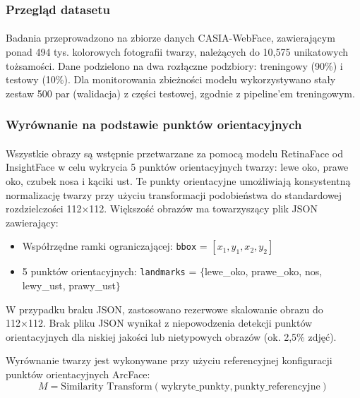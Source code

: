 \subsubsection{Przegląd datasetu}

\paragraph{}Badania przeprowadzono na zbiorze danych CASIA-WebFace, zawierającym ponad 494 tys. kolorowych fotografii twarzy, należących do 10,575 unikatowych tożsamości. Dane podzielono na dwa rozłączne podzbiory: treningowy (90\%) i testowy (10\%). Dla monitorowania zbieżności modelu wykorzystywano stały zestaw 500 par (walidacja) z części testowej, zgodnie z pipeline’em treningowym.

\subsubsection{Wyrównanie na podstawie punktów orientacyjnych}

\paragraph{}Wszystkie obrazy są wstępnie przetwarzane za pomocą modelu RetinaFace od InsightFace w celu wykrycia 5 punktów orientacyjnych twarzy: lewe oko, prawe oko, czubek nosa i kąciki ust. Te punkty orientacyjne umożliwiają konsystentną normalizację twarzy przy użyciu transformacji podobieństwa do standardowej rozdzielczości 112×112. Większość obrazów ma towarzyszący plik JSON zawierający:
\begin{itemize}
    \item Współrzędne ramki ograniczającej: \texttt{bbox} = $[x_1, y_1, x_2, y_2]$
    \item 5 punktów orientacyjnych: \texttt{landmarks} = $\{$lewe\_oko, prawe\_oko, nos, lewy\_ust, prawy\_ust$\}$
\end{itemize}

W przypadku braku JSON, zastosowano rezerwowe skalowanie obrazu do 112×112. Brak pliku JSON wynikał z niepowodzenia detekcji punktów orientacyjnych dla niskiej jakości lub nietypowych obrazów (ok. 2,5\% zdjęć).

Wyrównanie twarzy jest wykonywane przy użyciu referencyjnej konfiguracji punktów orientacyjnych ArcFace:
\begin{equation}
M = \text{Similarity Transform}(\text{wykryte\_punkty}, \text{punkty\_referencyjne})
\end{equation}

